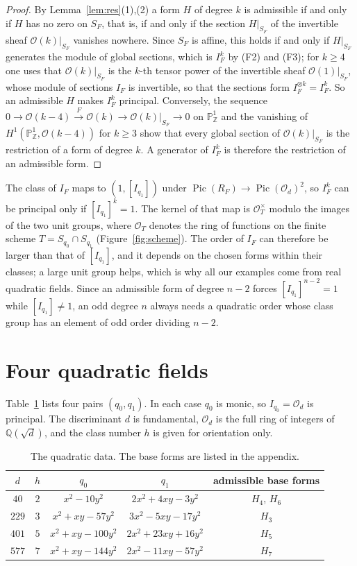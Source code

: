 \documentclass[11pt]{amsart}
\theoremstyle{definition}
\newcommand{\ZZ}{\mathbb{Z}}
\newcommand{\QQ}{\mathbb{Q}}
\newcommand{\PP}{\mathbb{P}}
\newcommand{\OO}{\mathcal{O}}
\DeclareMathOperator{\Pic}{Pic}
\begin{document}
\begin{proof}
By Lemma~\ref{lem:res}(1),(2) a form $H$ of degree $k$ is admissible if and only if $H$ has no zero on $S_F$, that is, if and only if the section $H|_{S_F}$ of the invertible sheaf $\OO(k)|_{S_F}$ vanishes nowhere. Since $S_F$ is affine, this holds if and only if $H|_{S_F}$ generates the module of global sections, which is $I_F^k$ by (F2) and (F3); for $k\ge4$ one uses that $\OO(k)|_{S_F}$ is the $k$-th tensor power of the invertible sheaf $\OO(1)|_{S_F}$, whose module of sections $I_F$ is invertible, so that the sections form $I_F^{\otimes k}=I_F^k$. So an admissible $H$ makes $I_F^k$ principal. Conversely, the sequence $0\to\OO(k-4)\xrightarrow{\,F\,}\OO(k)\to\OO(k)|_{S_F}\to0$ on $\PP^1_\ZZ$ and the vanishing of $H^1(\PP^1_\ZZ,\OO(k-4))$ for $k\ge3$ \cite[Theorem~III.5.1]{Har77} show that every global section of $\OO(k)|_{S_F}$ is the restriction of a form of degree $k$. A generator of $I_F^k$ is therefore the restriction of an admissible form.
\end{proof}

The class of $I_F$ maps to $(1,[I_{q_1}])$ under $\Pic(R_F)\to\Pic(\OO_d)^2$, so $I_F^k$ can be principal only if $[I_{q_1}]^k=1$. The kernel of that map is $\OO_T^\times$ modulo the images of the two unit groups, where $\OO_T$ denotes the ring of functions on the finite scheme $T=S_{q_0}\cap S_{q_1}$ (Figure~\ref{fig:scheme}). The order of $I_F$ can therefore be larger than that of $[I_{q_1}]$, and it depends on the chosen forms within their classes; a large unit group helps, which is why all our examples come from real quadratic fields. Since an admissible form of degree $n-2$ forces $[I_{q_1}]^{n-2}=1$ while $[I_{q_1}]\neq1$, an odd degree $n$ always needs a quadratic order whose class group has an element of odd order dividing $n-2$.

\section{Four quadratic fields}\label{sec:data}

Table~\ref{tab:data} lists four pairs $(q_0,q_1)$. In each case $q_0$ is monic, so $I_{q_0}=\OO_d$ is principal. The discriminant $d$ is fundamental, $\OO_d$ is the full ring of integers of $\QQ(\sqrt d)$, and the class number $h$ is given for orientation only.

\begin{table}[H]
\centering
\renewcommand{\arraystretch}{1.25}
\begin{tabular}{ccccc}
$d$ & $h$ & $q_0$ & $q_1$ & admissible base forms\\\hline
$40$ & $2$ & $x^2-10y^2$ & $2x^2+4xy-3y^2$ & $H_4$, $H_6$\\
$229$ & $3$ & $x^2+xy-57y^2$ & $3x^2-5xy-17y^2$ & $H_3$\\
$401$ & $5$ & $x^2+xy-100y^2$ & $2x^2+23xy+16y^2$ & $H_5$\\
$577$ & $7$ & $x^2+xy-144y^2$ & $2x^2-11xy-57y^2$ & $H_7$
\end{tabular}
\caption{The quadratic data. The base forms are listed in the appendix.}
\label{tab:data}
\end{table}
\end{document}
